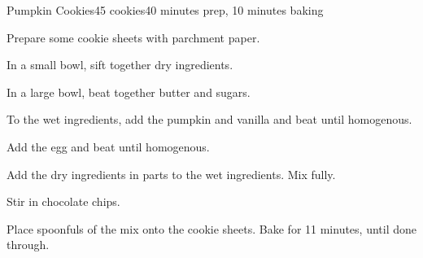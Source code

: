 \documentclass[../Cookbook.tex]{subfiles}
\begin{document}
\begin{recipe}{Pumpkin Cookies}{45 cookies}{40 minutes prep, 10 minutes baking}

 Prepare some cookie sheets with parchment paper.

In a small bowl, sift together dry ingredients.

In a large bowl, beat together butter and sugars.

To the wet ingredients, add the pumpkin and vanilla and beat until homogenous.

Add the egg and beat until homogenous.

\newstep
Add the dry ingredients in parts to the wet ingredients. Mix fully.

Stir in chocolate chips.

\newstep
Place spoonfuls of the mix onto the cookie sheets. Bake for 11 minutes, until done through.


\end{recipe}
\end{document}
